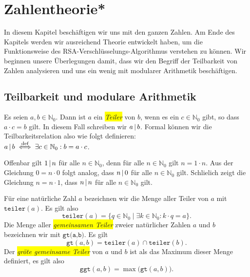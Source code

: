 \chapter{Zahlentheorie*}
In diesem Kapitel besch\"{a}ftigen wir uns mit den ganzen Zahlen.  Am Ende des Kapitels werden
wir ausreichend Theorie entwickelt haben, um die Funktionsweise des
RSA-Verschl\"{u}sselungs-Algorithmus verstehen zu k\"{o}nnen.  
Wir beginnen unsere \"{U}berlegungen damit, dass wir den Begriff der Teilbarkeit von Zahlen
analysieren und uns ein wenig mit modularer Arithmetik besch\"{a}ftigen.

\section{Teilbarkeit und modulare Arithmetik}

\begin{Definition}[Teiler]
  Es seien $a,b \in \mathbb{N}_0$.  Dann ist $a$ ein \colorbox{yellow}{\emph{Teiler}} von $b$, wenn es ein
  $c \in \mathbb{N}_0$ gibt, so dass $a \cdot c = b$ gilt.  In diesem Fall schreiben wir $a \,|\, b$.
  Formal k\"{o}nnen wir die Teilbarkeitsrelation also wie folgt definieren:
  \\[0.2cm]
  \hspace*{1.3cm}
  $a \,|\, b \;\stackrel{\mbox{\scriptsize def}}{\Longleftrightarrow}\; \exists c \in \mathbb{N}_0: b = a \cdot c$.
\end{Definition}

\remark
Offenbar gilt $1 \,|\, n$ f\"{u}r alle $n \in \mathbb{N}_0$, denn f\"{u}r alle $n \in \mathbb{N}_0$ gilt 
$n = 1 \cdot n$.   Aus der Gleichung $0 = n \cdot 0$ folgt analog, dass $n \,|\, 0$ f\"{u}r alle 
$n \in \mathbb{N}_0$ gilt.  Schlie\3lich zeigt die Gleichung $n = n \cdot 1$, dass $n \,|\, n$
f\"{u}r alle  $n \in \mathbb{N}_0$ gilt.
\vspace*{0.3cm}

F\"{u}r eine nat\"{u}rliche Zahl $a$ bezeichnen wir die Menge aller Teiler von $a$ mit
$\texttt{teiler}(a)$.  Es gilt also
\[ \texttt{teiler}(a) = \{ q \in \mathbb{N}_0 \mid \exists k \in \mathbb{N}_0: k \cdot q = a \}. \]
Die Menge aller \colorbox{yellow}{\emph{gemeinsamen Teiler}} zweier nat\"{u}rlicher Zahlen
$a$ und $b$ bezeichnen wir mit $\texttt{gt(a,b)}$.  Es gilt
\[ \texttt{gt}(a,b) = \texttt{teiler}(a) \cap \texttt{teiler}(b). \]
Der \colorbox{yellow}{\emph{gr\"{o}\3te gemeinsame Teiler}} von $a$ und $b$ ist als das Maximum dieser Menge definiert,
es gilt also 
\[ \texttt{ggt}(a,b) = \max\bigl(\texttt{gt}(a,b)\bigr). \]

